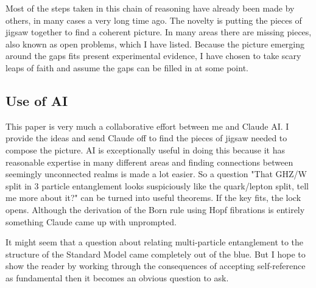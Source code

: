 \documentclass{article}
\theoremstyle{plain}
\theoremstyle{definition}
\theoremstyle{remark}\newtheorem*{remark}{Remark}
\begin{document}
Most of the steps taken in this chain of reasoning have already been made by others, in many cases a very long time ago. The novelty is putting the pieces of jigsaw together to find a coherent picture. In many areas there are missing pieces, also known as open problems, which I have listed. Because the picture emerging around the gaps fits present experimental evidence, I have chosen to take scary leaps of faith and assume the gaps can be filled in at some point. 

\subsection{Use of AI}
This paper is very much a collaborative effort between me and Claude AI. I provide the ideas and send Claude off to find the pieces of jigsaw needed to compose the picture. AI is exceptionally useful in doing this because it has reasonable expertise in many different areas and finding connections between seemingly unconnected realms is made a lot easier. So a question "That GHZ/W split in 3 particle entanglement looks suspiciously like the quark/lepton split, tell me more about it?" can be turned into useful theorems. If the key fits, the lock opens. Although the derivation of the Born rule using Hopf fibrations is entirely something Claude came up with unprompted. 

It might seem that a question about relating multi-particle entanglement to the structure of the Standard Model came completely out of the blue. But I hope to show the reader by working through the consequences of accepting self-reference as fundamental then it becomes an obvious question to ask. 
\end{document}
